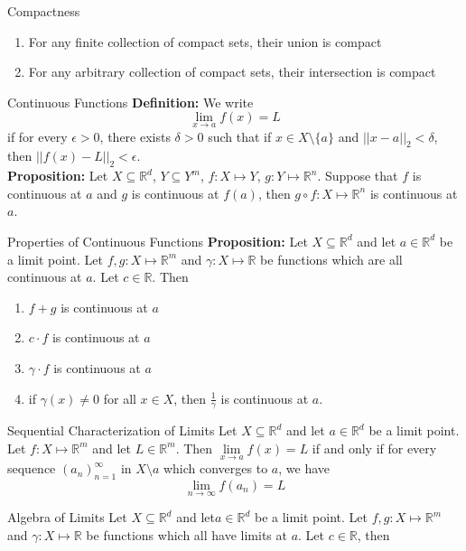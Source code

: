 \documentclass{article}
\begin{document}
\begin{multicols*}{3}
\begin{blackbox}{Compactness}
{\begin{enumerate}[label=(\roman*)]
    \item For any finite collection of compact sets, their union is compact
    \item For any arbitrary collection of compact sets, their intersection is compact
\end{enumerate}
}
\end{blackbox}
\begin{blackbox}{Continuous Functions}
    \textbf{Definition:} We write 
    \[ \lim_{x\rightarrow a} f(x) = L\]
    if for every $\epsilon > 0$, there exists $\delta > 0$ such that if $x \in X \setminus \{a\}$ and $||x-a||_2 < \delta$, then $||f(x) - L||_2 < \epsilon$. \\[1ex]
    \textbf{Proposition:} Let $X \subseteq \mathbb{R}^d$, $Y \subseteq Y^m$, $f: X \mapsto Y$, $g: Y \mapsto \mathbb{R}^n$. Suppose that $f$ is continuous at $a$ and $g$ is continuous at $f(a)$, then $g \circ f: X \mapsto \mathbb{R}^n$ is continuous at $a$.
\end{blackbox}
\begin{blackbox}{Properties of Continuous Functions}
    \textbf{Proposition:} Let $X \subseteq \mathbb{R}^d$ and let $a \in \mathbb{R}^d$ be a limit point. Let $f,g: X \mapsto \mathbb{R}^m$ and $\gamma: X \mapsto \mathbb{R}$ be functions which are all continuous at $a$. Let $c \in \mathbb{R}$. Then 
    \begin{enumerate}[label=(\roman*)]
        \item $f+g$ is continuous at $a$
        \item $c \cdot f$ is continuous at $a$
        \item $\gamma \cdot f$ is continuous at $a$
        \item if $\gamma(x) \neq 0$ for all $x \in X$, then $\frac{1}{\gamma}$ is continuous at $a$.
    \end{enumerate}
    \begin{bluebox}{Sequential Characterization of Limits}
        Let $X \subseteq \mathbb{R}^d$ and let $a \in \mathbb{R}^d$ be a limit point. Let $f: X \mapsto \mathbb{R}^m$ and let $L \in \mathbb{R}^m$. Then $\lim\limits_{x\rightarrow a} f(x) = L$ if and only if for every sequence $(a_n)^\infty_{n=1}$ in $X \setminus a$ which converges to $a$, we have 
        \[\lim_{n\rightarrow\infty} f(a_n) = L\]
    \end{bluebox}
    \begin{brownbox}{Algebra of Limits}
    Let $X \subseteq \mathbb{R}^d$ and let$a \in \mathbb{R}^d$ be a limit point. Let $f,g: X \mapsto \mathbb{R}^m$ and $\gamma: X \mapsto \mathbb{R}$ be functions which all have limits at $a$. Let $c \in \mathbb{R}$, then

\end{brownbox}
\end{blackbox}
\end{multicols*}
\end{document}
